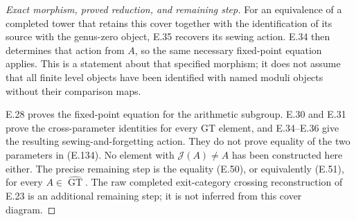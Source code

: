 \begin{proof}[Exact morphism, proved reduction, and remaining step]
For an equivalence of a completed
tower that retains this cover
together with the identification
of its source with the genus-zero
object, E.35 recovers its sewing
action.  E.34 then determines that
action from $A$, so the same
necessary fixed-point equation
applies.  This is a statement
about that specified morphism;
it does not assume that all
finite level objects have been
identified with named moduli
objects without their comparison
maps.

E.28 proves the fixed-point
equation for the arithmetic
subgroup.  E.30 and E.31 prove
the cross-parameter identities
for every GT element, and
E.34--E.36 give the resulting
sewing-and-forgetting action.
They do not prove equality of
the two parameters in (E.134).
No element with
$\mathcal J(A)\ne A$ has been
constructed here either.
The precise remaining step is
the equality (E.50), or
equivalently (E.51), for every
$A\in\widehat{\operatorname{GT}}$.
The raw completed exit-category
crossing reconstruction of
E.23 is an additional remaining
step; it is not inferred from
this cover diagram.
\end{proof}
